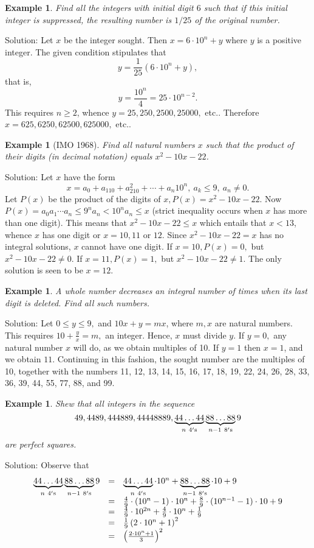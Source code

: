 \documentclass[11pt, openany]{book}
\theoremstyle{change} \theoremheaderfont{\blue\sffamily\bfseries}
\newtheorem{exa}[thm]{Example}
\theoremstyle{nonumberplain} \theoremheaderfont{\sffamily\bfseries}
\newcommand{\dis}{\displaystyle}
\newcommand{\í}{\'{\i}}
\begin{document}
\begin{exa} Find all the integers with initial digit $6$ such that if this initial integer is
suppressed, the resulting number is $1/25$ of the original
number.\end{exa} Solution: Let $x$ be the integer sought. Then $x
= 6\cdot 10^n + y$ where $y$ is a positive integer. The given
condition stipulates that
$$ y = \frac{1}{25}\left(6\cdot 10^n + y\right) ,$$that is,
$$y = \frac{10^{n}}{4} = 25\cdot 10^{n - 2}.$$This requires $n \geq 2$, whence
$y = 25, 250, 2500, 25000,$ etc.. Therefore $x = 625, 6250, 62500,
625000,$ etc..
\begin{exa}[IMO 1968] Find all natural numbers $x$ such that the product of
their digits (in decimal notation) equals $x^2 - 10x - 22$.
\end{exa}
Solution: Let $x$ have the form
$$x = a_0 + a_110 + a_210^2 + \cdots + a_{n}10^n, \ a_k \leq 9, \ a_n \neq 0.$$
Let $P(x)$ be the product of the digits of $x, P(x) = x^2 - 10x -
22.$ Now $P(x) = a_0a_1 \cdots a_n \leq 9^na_n < 10^na_n \leq x$
(strict inequality occurs when $x$ has more than one digit). This
means that $x^2 - 10x - 22 \leq x$ which entails that $x < 13$,
whence $x$ has one digit or $x = 10, 11$ or $12.$  Since $x^2 -
10x - 22 = x$ has no integral solutions, $x$ cannot have one
digit. If $x = 10, P(x) = 0,$ but $x^2 - 10x - 22 \neq 0.$ If $x =
11, P(x) = 1,$ but $x^2 - 10x - 22 \neq 1.$ The only solution is
seen to be $x = 12$.
\begin{exa}
A whole number decreases an integral number of times when its last
digit is deleted. Find all such numbers.
\end{exa}
Solution: Let $0 \leq y \leq 9,$ and $10x + y = mx$, where $m, x$
are natural numbers. This requires $\dis{10 + \frac{y}{x} = m},$
an integer. Hence, $x$ must divide $y$. If $y = 0,$ any natural
number $x$ will do, as we obtain multiples of 10. If $y = 1$ then
$x = 1$, and we obtain $11.$ Continuing in this fashion, the
sought number are the multiples of 10, together with the numbers
11, 12, 13, 14, 15, 16, 17, 18, 19, 22, 24, 26, 28, 33, 36, 39,
44, 55, 77, 88, and 99.
\begin{exa} Shew that all integers in the sequence
$$49, 4489, 444889, 44448889, \underbrace{44\ldots 44}_{n \ 4{\rm 's}}\underbrace{88 \ldots 88}_{n - 1 \ 8{\rm 's}}9 $$
are perfect squares.
\end{exa}
Solution: Observe that
$$
\begin{array}{lcl}\underbrace{44\ldots 44}_{n \ 4{\rm 's}}\underbrace{88 \ldots 88}_{n - 1 \ 8{\rm 's}}9
& =  & \underbrace{44\ldots 44}_{n \ 4{\rm 's}}\cdot 10^{n} + \underbrace{88 \ldots 88}_{n - 1 \ 8{\rm 's}}\cdot 10 + 9 \\
& = & \frac{4}{9}\cdot (10^{n} - 1)\cdot 10^{n} + \frac{8}{9}\cdot (10^{n - 1} - 1)\cdot 10 + 9 \\
& = & \frac{4}{9}\cdot 10^{2n}  + \frac{4}{9}\cdot 10^n +  \frac{1}{9}  \\
& = & \frac{1}{9}\left( 2\cdot 10^n  + 1 \right)^2  \\
& = & \left(\frac{2\cdot 10^n + 1}{3}\right)^2
\end{array}$$
\end{document}
